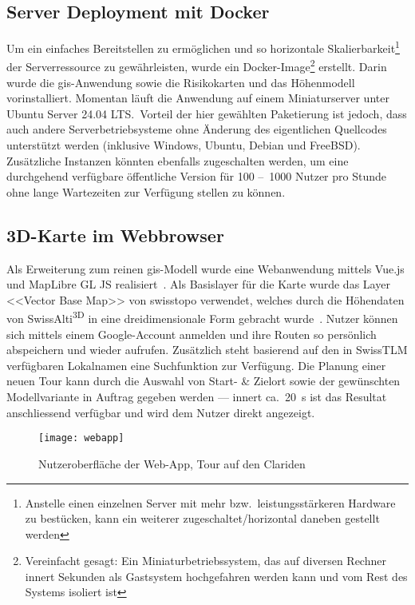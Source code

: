 \subsection{Server Deployment mit Docker}

Um ein einfaches Bereitstellen zu ermöglichen und so horizontale Skalierbarkeit\footnote{Anstelle einen einzelnen Server mit mehr bzw.\ leistungsstärkeren Hardware zu bestücken, kann ein weiterer zugeschaltet/horizontal daneben gestellt werden} der Serverressource zu gewährleisten, wurde ein Docker-Image\footnote{Vereinfacht gesagt: Ein Miniaturbetriebssystem, das auf diversen Rechner innert Sekunden als Gastsystem hochgefahren werden kann und vom Rest des Systems isoliert ist} erstellt. Darin wurde die \gls{gis}-Anwendung sowie die Risikokarten und das Höhenmodell vorinstalliert. Momentan läuft die Anwendung auf einem Miniaturserver unter Ubuntu Server 24.04 LTS.\ Vorteil der hier gewählten Paketierung ist jedoch, dass auch andere Serverbetriebsysteme ohne Änderung des eigentlichen Quellcodes unterstützt werden (inklusive Windows, Ubuntu, Debian und FreeBSD). Zusätzliche Instanzen könnten ebenfalls zugeschalten werden, um eine durchgehend verfügbare öffentliche Version für 100 --~1000 Nutzer pro Stunde ohne lange Wartezeiten zur Verfügung stellen zu können.

\clearpage
\subsection{3D-Karte im Webbrowser}

Als Erweiterung zum reinen \gls{gis}-Modell wurde eine Webanwendung mittels Vue.js und MapLibre GL JS realisiert~\cite{vuedevman}\cite{maplibregljs}. Als Basislayer für die Karte wurde das Layer <<Vector Base Map>> von swisstopo verwendet, welches durch die Höhendaten von SwissAlti\textsuperscript{3D} in eine dreidimensionale Form gebracht wurde~\cite{basevtprod}\cite{alti3dprod}. Nutzer können sich mittels einem Google-Account anmelden und ihre Routen so persönlich abspeichern und wieder aufrufen. Zusätzlich steht basierend auf den in SwissTLM verfügbaren Lokalnamen eine Suchfunktion zur Verfügung.
Die Planung einer neuen Tour kann durch die Auswahl von Start- \& Zielort sowie der gewünschten Modellvariante in Auftrag gegeben werden --- innert ca.\ \qty{20}{s} ist das Resultat anschliessend verfügbar und wird dem Nutzer direkt angezeigt.


  \begin{figure}[H]
    \centering
    \texttt{[image: webapp]}
    \caption{Nutzeroberfläche der Web-App, Tour auf den Clariden}\label{fig:mainui}
  \end{figure}



